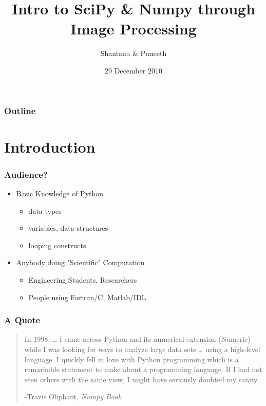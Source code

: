 \documentclass[presentation]{beamer}
\begin{document}
\title{Intro to SciPy \& Numpy \newline through Image Processing}
\author{Shantanu \& Puneeth}
\date{29 December 2010}
\maketitle

\begin{frame}
\frametitle{Outline}
\setcounter{tocdepth}{3}
\tableofcontents
\end{frame}







\section{Introduction}
\label{sec-1}
\begin{frame}
\frametitle{Audience?}
\label{sec-1_1}
\begin{itemize}

\item Basic Knowledge of Python
\label{sec-1_1_1}%
\begin{itemize}
\item data types
\item variables, data-structures
\item looping constructs
\end{itemize}

\item Anybody doing "Scientific" Computation
\label{sec-1_1_2}%
\begin{itemize}
\item Engineering Students, Researchers
\item People using Fortran/C, Matlab/IDL
\end{itemize}
\end{itemize} %
\end{frame}
\begin{frame}
\frametitle{A Quote}
\label{sec-1_2}

\begin{quote}
In 1998, \ldots{} I came across Python and its numerical extension
(Numeric) while I was looking for ways to analyze large data sets
\ldots{} using a high-level language. I quickly fell in love with Python
programming which is a remarkable statement to make about a
programming language. If I had not seen others with the same view,
I might have seriously doubted my sanity.

-Travis Oliphant, \emph{Numpy Book}
\end{quote}
\end{frame}
\end{document}
